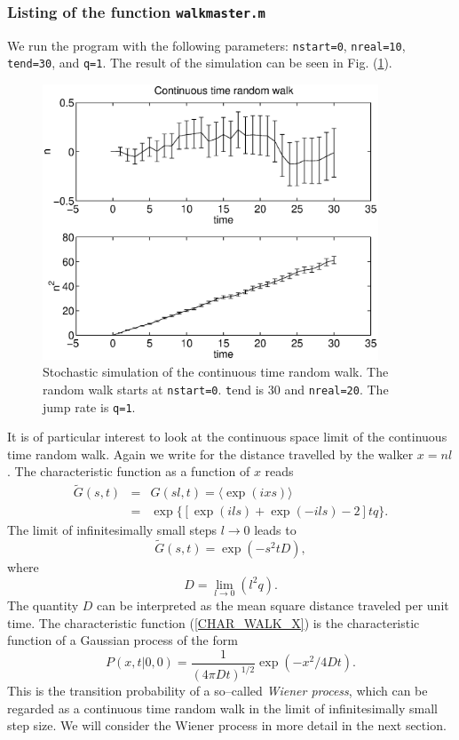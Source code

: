 \subsubsection{Listing of the function \texttt{walkmaster.m}}

We run the program with the following parameters: 
\texttt{nstart=0}, \texttt{nreal=10}, \texttt{tend=30}, and
\texttt{q=1}. The result of the simulation can be seen in
Fig. (\ref{F_CTRW}).
\begin{figure}
\label{F_CTRW}
\includegraphics[width=10cm]{./Figures/f_ctrw.eps}
\caption{Stochastic simulation of the continuous time
random walk. The 
random walk starts at \texttt{nstart=0}.  
{\texttt tend} is 30 and \texttt{nreal=20}.
The jump rate is \texttt{q=1}.}
\end{figure}

It is of particular interest to look at the continuous space limit
of the continuous time random walk. Again we write for the 
distance travelled by the walker $x=nl$. The characteristic
function as a function of $x$ reads
\begin{eqnarray*}
\tilde{G}(s,t) &=& G(sl,t) = \langle \exp(ixs) \rangle \\
                &=& \exp\{[\exp(ils) + \exp(-ils)-2]tq \}.
\end{eqnarray*}
The limit of infinitesimally small steps $l \longrightarrow 0$ 
leads to
\begin{equation}
\label{CHAR_WALK_X}
\tilde{G}(s,t) = \exp(-s^2tD),
\end{equation}
where
\begin{equation*}
D=\lim_{l\rightarrow 0} (l^2q).
\end{equation*}
The quantity $D$ can be interpreted as the mean square distance 
traveled  per unit time.  The characteristic function (\ref{CHAR_WALK_X})
is the characteristic function of a Gaussian process of the form
\begin{equation*}
P(x,t|0,0) = \frac{1}{(4\pi Dt)^{1/2}} \exp\left( -x^2/4Dt 
\right).
\end{equation*}
This is the transition probability of a so--called {\em Wiener process},
which can be regarded as a continuous time random walk in the 
limit of infinitesimally small step size. We will consider the 
Wiener process in more detail in the next section.

